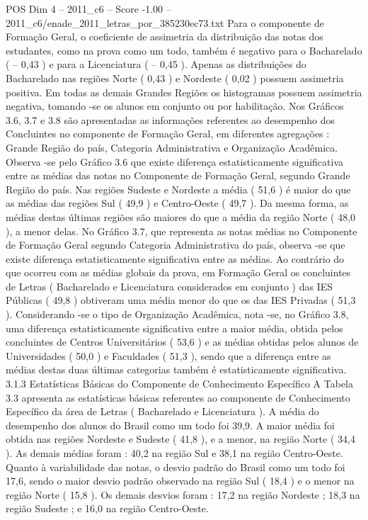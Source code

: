 \begin{textsample}{POS Dim 4 – 2011\_c6 – Score -1.00 – 2011\_c6/enade\_2011\_letras\_por\_385230ec73.txt}
Para o componente de Formação Geral, o coeficiente de assimetria da distribuição das notas dos estudantes, como na prova como um todo, também é negativo para o Bacharelado ( – 0,43 ) e para a Licenciatura ( – 0,45 ).
Apenas as distribuições do Bacharelado nas regiões Norte ( 0,43 ) e Nordeste ( 0,02 ) possuem assimetria positiva.
Em todas as demais Grandes Regiões os histogramas possuem assimetria negativa, tomando -se os alunos em conjunto ou por habilitação.
Nos Gráficos 3.6, 3.7 e 3.8 são apresentadas as informações referentes ao desempenho dos Concluintes no componente de Formação Geral, em diferentes agregações : Grande Região do país, Categoria Administrativa e Organização Acadêmica.
Observa -se pelo Gráfico 3.6 que existe diferença estatisticamente significativa entre as médias das notas no Componente de Formação Geral, segundo Grande Região do país.
Nas regiões Sudeste e Nordeste a média ( 51,6 ) é maior do que as médias das regiões Sul ( 49,9 ) e Centro-Oeste ( 49,7 ).
Da mesma forma, as médias destas últimas regiões são maiores do que a média da região Norte ( 48,0 ), a menor delas.
No Gráfico 3.7, que representa as notas médias no Componente de Formação Geral segundo Categoria Administrativa do país, observa -se que existe diferença estatisticamente significativa entre as médias.
Ao contrário do que ocorreu com as médias globais da prova, em Formação Geral os concluintes de Letras ( Bacharelado e Licenciatura considerados em conjunto ) das IES Públicas ( 49,8 ) obtiveram uma média menor do que os das IES Privadas ( 51,3 ).
Considerando -se o tipo de Organização Acadêmica, nota -se, no Gráfico 3.8, uma diferença estatisticamente significativa entre a maior média, obtida pelos concluintes de Centros Universitários ( 53,6 ) e as médias obtidas pelos alunos de Universidades ( 50,0 ) e Faculdades ( 51,3 ), sendo que a diferença entre as médias destas duas últimas categorias também é estatisticamente significativa. 3.1.3 Estatísticas Básicas do Componente de Conhecimento Específico A Tabela 3.3 apresenta as estatísticas básicas referentes ao componente de Conhecimento Específico da área de Letras ( Bacharelado e Licenciatura ).
A média do desempenho dos alunos do Brasil como um todo foi 39,9.
A maior média foi obtida nas regiões Nordeste e Sudeste ( 41,8 ), e a menor, na região Norte ( 34,4 ).
As demais médias foram : 40,2 na região Sul e 38,1 na região Centro-Oeste.
Quanto à variabilidade das notas, o desvio padrão do Brasil como um todo foi 17,6, sendo o maior desvio padrão observado na região Sul ( 18,4 ) e o menor na região Norte ( 15,8 ).
Os demais desvios foram : 17,2 na região Nordeste ; 18,3 na região Sudeste ; e 16,0 na região Centro-Oeste.

\end{textsample}
